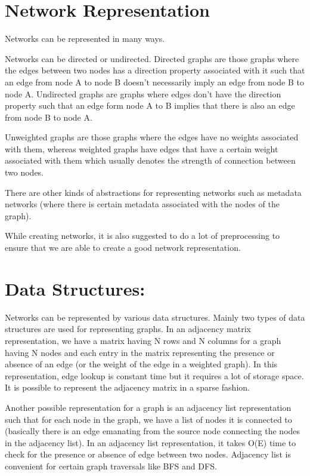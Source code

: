 \section{Network Representation}
Networks can be represented in many ways.


Networks can be directed or undirected. Directed graphs are those graphs where the edges between two nodes has a direction property associated with it such that an edge from node A to node B doesn’t necessarily imply an edge from node B to node A. Undirected graphs are graphs where edges don’t have the direction property such that an edge form node A to B implies that there is also an edge from node B to node A.


Unweighted graphs are those graphs where the edges have no weights associated with them, whereas weighted graphs have edges that have a certain weight associated with them which usually denotes the strength of connection between two nodes.


There are other kinds of abstractions for representing networks such as metadata networks (where there is certain metadata associated with the nodes of the graph).


While creating networks, it is also suggested to do a lot of preprocessing to ensure that we are able to create a good network representation.
\section{Data Structures:}
Networks can be represented by various data structures. Mainly two types of data structures are used for representing graphs. In an adjacency matrix representation, we have a matrix having N rows and N columns for a graph having N nodes and each entry in the matrix representing the presence or absence of an edge (or the weight of the edge in a weighted graph). In this representation, edge lookup is constant time but it requires a lot of storage space. It is possible to represent the adjacency matrix in a sparse fashion.


Another possible representation for a graph is an adjacency list representation such that for each node in the graph, we have a list of nodes it is connected to (basically there is an edge emanating from the source node connecting the nodes in the adjacency list). In an adjacency list representation, it takes O(E) time to check for the presence or absence of edge between two nodes. Adjacency list is convenient for certain graph traversals like BFS and DFS.

